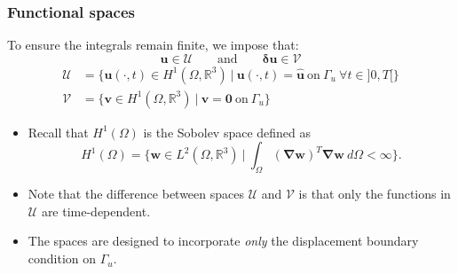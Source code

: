 \documentclass[aspectratio=169]{beamer}
\begin{document}
\begin{frame}
  \frametitle{Functional spaces}
  \begin{block}{}
    To ensure the integrals remain finite, we impose that:
    $$\mathbf u\in\mathcal U\qquad\mbox{and}\qquad \boldsymbol\delta\mathbf u\in\mathcal V$$
    \vspace{-1cm}
    \begin{align*}
      \mathcal U & =\big\{\mathbf u(\cdot,t)\in H^1(\Omega,\mathbb R^{3})\ |\ \mathbf u(\cdot,t)=\mathbf{\hat u}\ \mbox{on}\ \Gamma_u\ \forall t\in]0,T[\big\} \\
      \mathcal V & =\big\{\mathbf v\in H^1(\Omega,\mathbb R^{3})\ |\ \mathbf v=\mathbf 0\ \mbox{on}\ \Gamma_u\big\}
    \end{align*}
  \end{block}
  \vspace{-0.1cm}
  \begin{itemize}
    \item Recall that $H^1(\Omega)$ is the Sobolev space defined as
          $$H^1(\Omega)=\big\{\mathbf w\in L^2(\Omega,\mathbb R^{3})\ |\ \int_\Omega(\boldsymbol\nabla \mathbf w)^{T}\boldsymbol\nabla \mathbf w \ d\Omega<\infty \big\}.$$
    \item Note that the difference between spaces $\mathcal U$ and $\mathcal V$ is that only the functions in $\mathcal U$ are time-dependent.
    \item The spaces are designed to incorporate \emph{only} the displacement boundary condition on $\Gamma_{u}$.
  \end{itemize}
  \vspace{0.3cm}
\end{frame}
\end{document}
